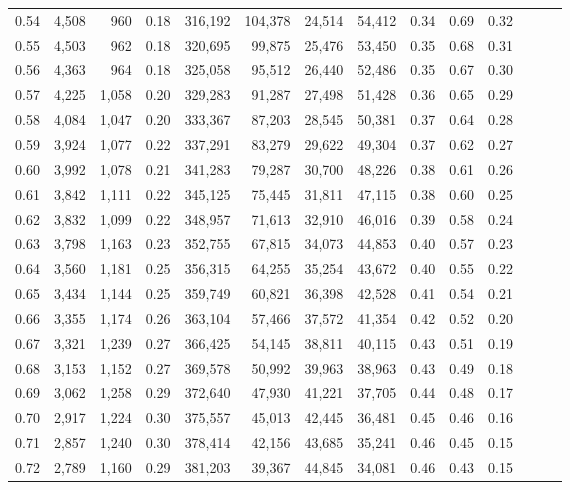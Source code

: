 \begin{tabular}{rrrrrrrrrrrrrr}
0.54 &  4,508 &    960 &  0.18 &  316,192 &  104,378 &  24,514 &  54,412 &  0.34 &  0.69 &      0.32 \\
0.55 &  4,503 &    962 &  0.18 &  320,695 &   99,875 &  25,476 &  53,450 &  0.35 &  0.68 &      0.31 \\
0.56 &  4,363 &    964 &  0.18 &  325,058 &   95,512 &  26,440 &  52,486 &  0.35 &  0.67 &      0.30 \\
0.57 &  4,225 &  1,058 &  0.20 &  329,283 &   91,287 &  27,498 &  51,428 &  0.36 &  0.65 &      0.29 \\
0.58 &  4,084 &  1,047 &  0.20 &  333,367 &   87,203 &  28,545 &  50,381 &  0.37 &  0.64 &      0.28 \\
0.59 &  3,924 &  1,077 &  0.22 &  337,291 &   83,279 &  29,622 &  49,304 &  0.37 &  0.62 &      0.27 \\
0.60 &  3,992 &  1,078 &  0.21 &  341,283 &   79,287 &  30,700 &  48,226 &  0.38 &  0.61 &      0.26 \\
0.61 &  3,842 &  1,111 &  0.22 &  345,125 &   75,445 &  31,811 &  47,115 &  0.38 &  0.60 &      0.25 \\
0.62 &  3,832 &  1,099 &  0.22 &  348,957 &   71,613 &  32,910 &  46,016 &  0.39 &  0.58 &      0.24 \\
0.63 &  3,798 &  1,163 &  0.23 &  352,755 &   67,815 &  34,073 &  44,853 &  0.40 &  0.57 &      0.23 \\
0.64 &  3,560 &  1,181 &  0.25 &  356,315 &   64,255 &  35,254 &  43,672 &  0.40 &  0.55 &      0.22 \\
0.65 &  3,434 &  1,144 &  0.25 &  359,749 &   60,821 &  36,398 &  42,528 &  0.41 &  0.54 &      0.21 \\
0.66 &  3,355 &  1,174 &  0.26 &  363,104 &   57,466 &  37,572 &  41,354 &  0.42 &  0.52 &      0.20 \\
0.67 &  3,321 &  1,239 &  0.27 &  366,425 &   54,145 &  38,811 &  40,115 &  0.43 &  0.51 &      0.19 \\
0.68 &  3,153 &  1,152 &  0.27 &  369,578 &   50,992 &  39,963 &  38,963 &  0.43 &  0.49 &      0.18 \\
0.69 &  3,062 &  1,258 &  0.29 &  372,640 &   47,930 &  41,221 &  37,705 &  0.44 &  0.48 &      0.17 \\
0.70 &  2,917 &  1,224 &  0.30 &  375,557 &   45,013 &  42,445 &  36,481 &  0.45 &  0.46 &      0.16 \\
0.71 &  2,857 &  1,240 &  0.30 &  378,414 &   42,156 &  43,685 &  35,241 &  0.46 &  0.45 &      0.15 \\
0.72 &  2,789 &  1,160 &  0.29 &  381,203 &   39,367 &  44,845 &  34,081 &  0.46 &  0.43 &      0.15 \\

\end{tabular}
